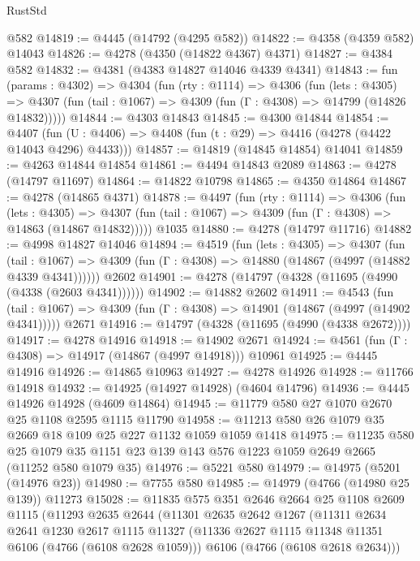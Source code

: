 \begin{lexlean}{RustStd}
\begin{coremodule}
{\begin{coremodule}
{{{{{{{{{{{{{{{{{{{{{{{{{{{{{{{{{{{    @582
@14819 := @4445 (@14792 (@4295 @582))
@14822 := @4358 (@4359 @582) @14043
@14826 := @4278 (@4350 (@14822 @4367) @4371)
@14827 := @4384 @582
@14832 := @4381 (@4383 @14827 @14046 @4339 @4341)
@14843 := fun (params : @4302) =>
  @4304
    (fun (rty : @1114) =>
    @4306
      (fun (lets : @4305) =>
      @4307 (fun (tail : @1067) => @4309 (fun (Γ : @4308) => @14799 (@14826 @14832)))))
@14844 := @4303 @14843
@14845 := @4300 @14844
@14854 := @4407
    (fun (U : @4406) => @4408 (fun (t : @29) => @4416 (@4278 (@4422 @14043 @4296) @4433)))
@14857 := @14819 (@14845 @14854) @14041
@14859 := @4263 @14844 @14854
@14861 := @4494 @14843 @2089
@14863 := @4278 (@14797 @11697)
@14864 := @14822 @10798
@14865 := @4350 @14864
@14867 := @4278 (@14865 @4371)
@14878 := @4497
    (fun (rty : @1114) =>
    @4306
      (fun (lets : @4305) =>
      @4307 (fun (tail : @1067) => @4309 (fun (Γ : @4308) => @14863 (@14867 @14832)))))
    @1035
@14880 := @4278 (@14797 @11716)
@14882 := @4998 @14827 @14046
@14894 := @4519
    (fun (lets : @4305) =>
    @4307
      (fun (tail : @1067) =>
      @4309 (fun (Γ : @4308) => @14880 (@14867 (@4997 (@14882 @4339 @4341))))))
    @2602
@14901 := @4278 (@14797 (@4328 (@11695 (@4990 (@4338 (@2603 @4341))))))
@14902 := @14882 @2602
@14911 := @4543
    (fun (tail : @1067) => @4309 (fun (Γ : @4308) => @14901 (@14867 (@4997 (@14902 @4341)))))
    @2671
@14916 := @14797 (@4328 (@11695 (@4990 (@4338 @2672))))
@14917 := @4278 @14916
@14918 := @14902 @2671
@14924 := @4561 (fun (Γ : @4308) => @14917 (@14867 (@4997 @14918))) @10961
@14925 := @4445 @14916
@14926 := @14865 @10963
@14927 := @4278 @14926
@14928 := @11766 @14918
@14932 := @14925 (@14927 @14928) (@4604 @14796)
@14936 := @4445 @14926 @14928 (@4609 @14864)
@14945 := @11779 @580 @27 @1070 @2670 @25 @1108 @2595 @1115 @11790
@14958 := @11213 @580 @26 @1079 @35 @2669 @18 @109 @25 @227 @1132 @1059 @1059 @1418
@14975 := @11235
    @580
    @25
    @1079
    @35
    @1151
    @23
    @139
    @143
    @576
    @1223
    @1059
    @2649
    @2665
    (@11252 @580 @1079 @35)
@14976 := @5221 @580
@14979 := @14975 (@5201 (@14976 @23))
@14980 := @7755 @580
@14985 := @14979 (@4766 (@14980 @25 @139)) @11273
@15028 := @11835
    @575
    @351
    @2646
    @2664
    @25
    @1108
    @2609
    @1115
    (@11293
      @2635
      @2644
      (@11301
        @2635
        @2642
        @1267
        (@11311
          @2634
          @2641
          @1230
          @2617
          @1115
          @11327
          (@11336 @2627 @1115 @11348 @11351 @6106 (@4766 (@6108 @2628 @1059)))
          @6106
          (@4766 (@6108 @2618 @2634)))
}}}}}}}}}}}}}}}}}}}}}}}}}}}}}}}}}}}
\end{coremodule}}
\end{coremodule}
\end{lexlean}

